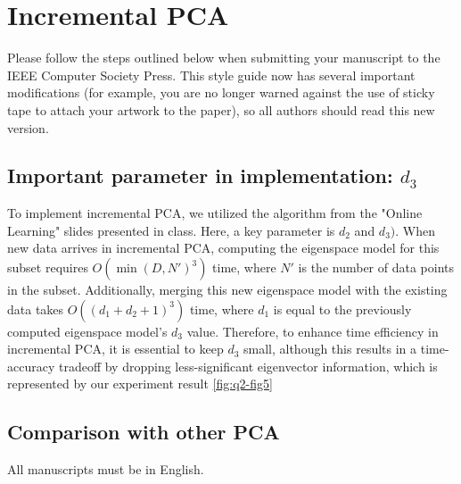 \section{Incremental PCA}
\label{sec:intro}

Please follow the steps outlined below when submitting your manuscript to the IEEE Computer Society Press.
This style guide now has several important modifications (for example, you are no longer warned against the use of sticky tape to attach your artwork to the paper), so all authors should read this new version.

\subsection{Important parameter in implementation: $d_3$}
To implement incremental PCA, we utilized the algorithm from the "Online Learning" slides presented in class. Here, a key parameter is $d_2$ and $d_3)$. When new data arrives in incremental PCA, computing the eigenspace model for this subset requires $O(\min(D, N')^3)$ time, where $N'$ is the number of data points in the subset. Additionally, merging this new eigenspace model with the existing data takes $O((d_1 + d_2 + 1)^3)$ time, where $d_1$ is equal to the previously computed eigenspace model's $d_3$ value. Therefore, to enhance time efficiency in incremental PCA, it is essential to keep $d_3$ small, although this results in a time-accuracy tradeoff by dropping less-significant eigenvector information, which is represented by our experiment result \cref{fig:q2-fig5}

\subsection{Comparison with other PCA}

All manuscripts must be in English.
